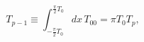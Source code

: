 \begin{equation}
T_{p-1}\equiv \int_{-\frac{\pi}{2}T_{0}}^{\frac{\pi}{2}T_{0}}
dx \, T_{00} = \pi T_{0} T_{p},
\label{ttq}
\end{equation}

